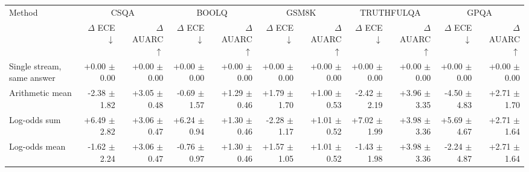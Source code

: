 \begin{tabular}{lrrrrrrrrrr}
\toprule
Method & \multicolumn{2}{c}{CSQA} & \multicolumn{2}{c}{BOOLQ} & \multicolumn{2}{c}{GSM8K} & \multicolumn{2}{c}{TRUTHFULQA} & \multicolumn{2}{c}{GPQA} \\
 & $\Delta$ ECE $\downarrow$ & $\Delta$ AUARC $\uparrow$ & $\Delta$ ECE $\downarrow$ & $\Delta$ AUARC $\uparrow$ & $\Delta$ ECE $\downarrow$ & $\Delta$ AUARC $\uparrow$ & $\Delta$ ECE $\downarrow$ & $\Delta$ AUARC $\uparrow$ & $\Delta$ ECE $\downarrow$ & $\Delta$ AUARC $\uparrow$ \\
\midrule
Single stream, same answer & +0.00 {\scriptsize $\pm$ 0.00} & +0.00 {\scriptsize $\pm$ 0.00} & +0.00 {\scriptsize $\pm$ 0.00} & +0.00 {\scriptsize $\pm$ 0.00} & +0.00 {\scriptsize $\pm$ 0.00} & +0.00 {\scriptsize $\pm$ 0.00} & +0.00 {\scriptsize $\pm$ 0.00} & +0.00 {\scriptsize $\pm$ 0.00} & +0.00 {\scriptsize $\pm$ 0.00} & +0.00 {\scriptsize $\pm$ 0.00} \\
Arithmetic mean & -2.38 {\scriptsize $\pm$ 1.82} & +3.05 {\scriptsize $\pm$ 0.48} & -0.69 {\scriptsize $\pm$ 1.57} & +1.29 {\scriptsize $\pm$ 0.46} & +1.79 {\scriptsize $\pm$ 1.70} & +1.00 {\scriptsize $\pm$ 0.53} & -2.42 {\scriptsize $\pm$ 2.19} & +3.96 {\scriptsize $\pm$ 3.35} & -4.50 {\scriptsize $\pm$ 4.83} & +2.71 {\scriptsize $\pm$ 1.70} \\
Log-odds sum & +6.49 {\scriptsize $\pm$ 2.82} & +3.06 {\scriptsize $\pm$ 0.47} & +6.24 {\scriptsize $\pm$ 0.94} & +1.30 {\scriptsize $\pm$ 0.46} & -2.28 {\scriptsize $\pm$ 1.17} & +1.01 {\scriptsize $\pm$ 0.52} & +7.02 {\scriptsize $\pm$ 1.99} & +3.98 {\scriptsize $\pm$ 3.36} & +5.69 {\scriptsize $\pm$ 4.67} & +2.71 {\scriptsize $\pm$ 1.64} \\
Log-odds mean & -1.62 {\scriptsize $\pm$ 2.24} & +3.06 {\scriptsize $\pm$ 0.47} & -0.76 {\scriptsize $\pm$ 0.97} & +1.30 {\scriptsize $\pm$ 0.46} & +1.57 {\scriptsize $\pm$ 1.05} & +1.01 {\scriptsize $\pm$ 0.52} & -1.43 {\scriptsize $\pm$ 1.98} & +3.98 {\scriptsize $\pm$ 3.36} & -2.24 {\scriptsize $\pm$ 4.87} & +2.71 {\scriptsize $\pm$ 1.64} \\

\end{tabular}

